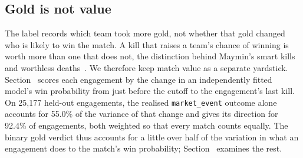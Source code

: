 \subsection{Gold is not value}\label{sec:label-value}

The label records which team took more gold, not whether that gold changed who is likely to win the
match. A kill that raises a team's chance of winning is worth more than one that does not, the
distinction behind Maymin's smart kills and worthless deaths~\cite{maymin2021smart}. We therefore keep
match value as a separate yardstick. Section~ scores each engagement by the change in
an independently fitted model's win probability from just before the cutoff to the engagement's last
kill. On 25,177 held-out engagements, the realised \texttt{market\_event} outcome alone accounts for
55.0\% of the variance of that change and gives its direction for 92.4\% of engagements, both weighted
so that every match counts equally. The binary gold verdict thus accounts for a little over half of the variation in what
an engagement does to the match's win probability; Section~ examines the rest.

